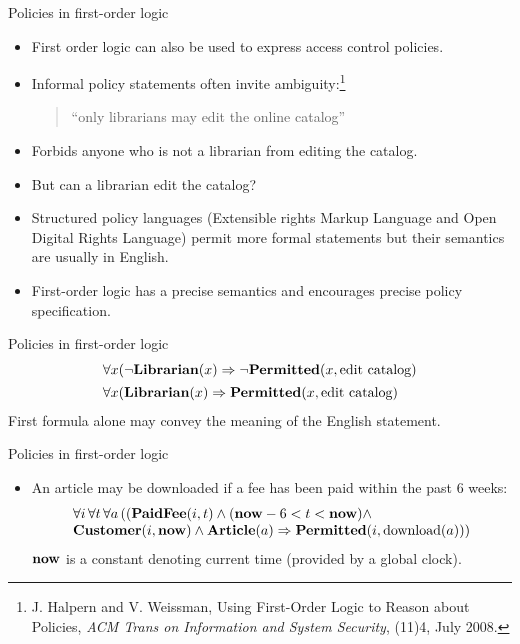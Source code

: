 \documentclass[style=sailor,size=12pt]{powerdot}
\newcommand{\rid}[1]{\mbox{\rm #1}}
\newcommand{\bid}[1]{\mbox{\bf #1}}
\theoremstyle{definition}
\begin{document}
\begin{wideslide}[bm=,toc=]{Policies in first-order logic}
\begin{itemize}
\item First order logic can also be used to express access control policies.
\item Informal policy statements often invite ambiguity:\footnote{
J. Halpern and V. Weissman, 
Using First-Order Logic to Reason about Policies, {\em ACM Trans on Information and System Security\/},
(11)4, July 2008.}
\begin{quote}
``only librarians may edit the online catalog''
\end{quote}
\item Forbids anyone who is not a librarian from editing the catalog.
\item But can a librarian edit the catalog?
\item Structured policy languages (Extensible rights Markup Language and Open Digital Rights Language)
permit more formal statements but their semantics are usually in English.
\item First-order logic has a precise semantics and encourages precise policy specification.
\end{itemize}
\end{wideslide}

\begin{wideslide}[bm=,toc=]{Policies in first-order logic}
\begin{displaymath}
\begin{array}{l}
\forall x(\neg\bid{Librarian}(x)\Rightarrow \neg\bid{Permitted}(x,\rid{edit catalog}) \\[1ex]
\forall x(\bid{Librarian}(x)\Rightarrow \bid{Permitted}(x,\rid{edit catalog})
\end{array}
\end{displaymath}
First formula alone may convey the meaning of the English statement.
\end{wideslide}

\begin{wideslide}[bm=,toc=]{Policies in first-order logic}
\begin{itemize}
\item An article may be downloaded if a fee has been paid within the past 6 weeks:
\begin{displaymath}
\begin{array}{l}
\forall i\, \forall t\, \forall a\, ((\bid{PaidFee}(i,t)\wedge (\bid{now} - 6 < t < \bid{now})\wedge \\
\bid{Customer}(i,\bid{now})\wedge\bid{Article}(a) \Rightarrow \bid{Permitted}(i,\rid{download}(a)))
\end{array}
\end{displaymath}
$\bid{now}$ is a constant denoting current time (provided by a global clock).
\end{itemize}
\end{wideslide}
\end{document}
